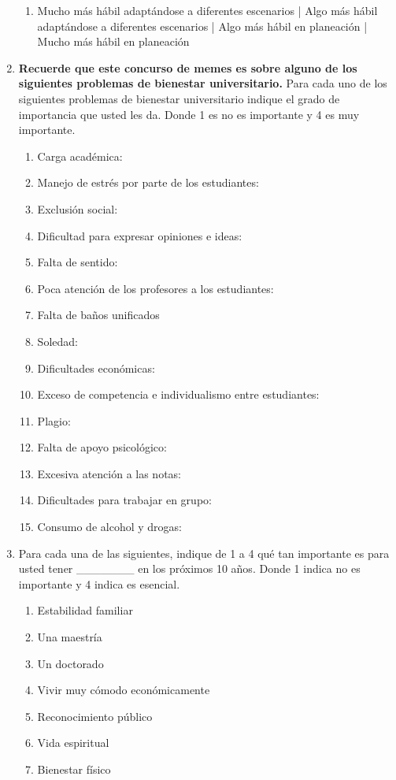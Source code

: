 \begin{enumerate}
\begin{enumerate}
    \item Mucho más hábil adaptándose a diferentes escenarios | Algo más hábil adaptándose a diferentes escenarios | Algo más hábil en planeación | Mucho más hábil en planeación
\end{enumerate}
\item \textbf{Recuerde que este concurso de memes es sobre alguno de los siguientes problemas de bienestar universitario.} Para cada uno de los siguientes problemas de bienestar universitario indique el grado de importancia que usted les da. Donde 1 es no es importante y 4 es muy importante.
\begin{enumerate}
\item Carga académica:
\item Manejo de estrés por parte de los estudiantes:
\item Exclusión social:
\item Dificultad para expresar opiniones e ideas:
\item Falta de sentido:
\item Poca atención de los profesores a los estudiantes:
\item Falta de baños unificados
\item Soledad:
\item Dificultades económicas:
\item Exceso de competencia e individualismo entre estudiantes:
\item Plagio:
\item Falta de apoyo psicológico:
\item Excesiva atención a las notas:
\item Dificultades para trabajar en grupo:
\item Consumo de alcohol y drogas:
\end{enumerate}
\item Para cada una de las siguientes, indique de 1 a 4 qué tan importante es para usted tener \_\_\_\_\_\_\_ en los próximos 10 años. Donde 1 indica no es importante y 4 indica es esencial.
\begin{enumerate}
\item Estabilidad familiar
\item Una maestría
\item Un doctorado
\item Vivir muy cómodo económicamente
\item Reconocimiento público 
\item Vida espiritual
\item Bienestar físico

\end{enumerate}
\end{enumerate}
